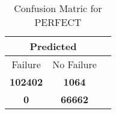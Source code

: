 \begin{table}[] 
\caption{Confusion Matric for PERFECT} 
\label{Table: Prediction Accuracy-DMDPERFECTOnlySunEKF-combinationReflectionEKF-top2perfectNoFailurePrediction-Reflection} 
\centering 
\begin{tabular} 
 {@{}ccc@{}} 
\toprule 
\multicolumn{2}{c}{\textbf{Predicted}}
 \\ \midrule 
\multicolumn{1}{|c|}{Failure} & 
\multicolumn{1}{c|}{No Failure}
 \\ \midrule 
\multicolumn{1}{|c|}{\color{green}\textbf{102402}} & 
\multicolumn{1}{c|}{\color{red}\textbf{1064}}
 \\ \midrule 
\multicolumn{1}{|c|}{\color{red}\textbf{0}} & 
\multicolumn{1}{c|}{\color{green}\textbf{66662}}
 \\ \bottomrule 
\end{tabular} 
\end{table} 
